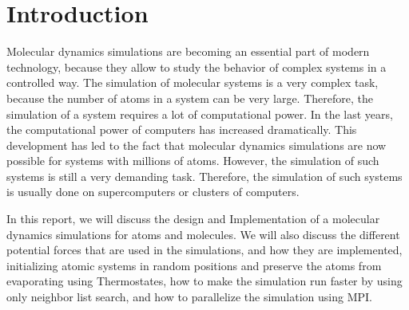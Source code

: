 \chapter{Introduction}\label{chap:introduction}

Molecular dynamics simulations are becoming an essential part of modern technology, because
they allow to study the behavior of complex systems in a controlled way. The simulation of
molecular systems is a very complex task, because the number of atoms in a system can be
very large. Therefore, the simulation of a system requires a lot of computational power. In
the last years, the computational power of computers has increased dramatically. This
development has led to the fact that molecular dynamics simulations are now possible for
systems with millions of atoms. However, the simulation of such systems is still a very
demanding task. Therefore, the simulation of such systems is usually done on supercomputers
or clusters of computers.  

In this report, we will discuss the design and Implementation of a molecular 
dynamics simulations for atoms and molecules. We will also discuss the different potential
forces that are used in the simulations, and how they are implemented, initializing atomic 
systems in random positions and preserve the atoms from evaporating using Thermostates, how
to make the simulation run faster by using only neighbor list search, and how to parallelize
the simulation using MPI.